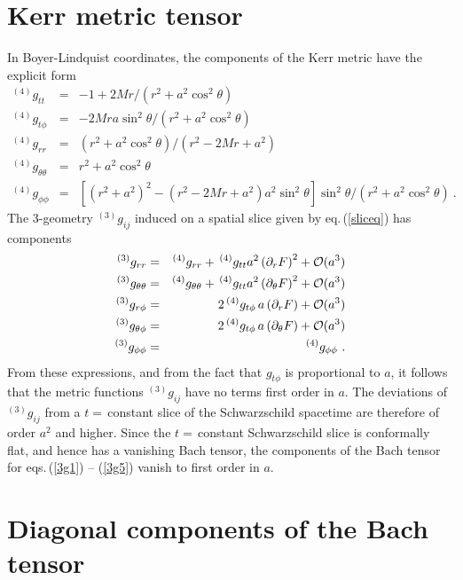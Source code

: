 \section{Kerr metric tensor}
In Boyer-Lindquist\cite{boyerlindquist} coordinates, the components
of the Kerr metric have the explicit form
\begin{eqnarray}
^{(4)}g_{tt} &=& -1+2Mr/(r^2+a^2\cos^2\theta) \label{METRICstart}\\
^{(4)}g_{t\phi} &=& -2Mra\sin^2\theta/(r^2+a^2\cos^2\theta)\\
^{(4)}g_{rr}&=& (r^2+a^2\cos^2\theta)/(r^2-2Mr+a^2)\label{grr}\\
^{(4)}g_{\theta\theta} &=&  r^2+a^2\cos^2\theta\label{METRICpenult}\\
^{(4)}g_{\phi\phi} &=&
[(r^2+a^2)^2-(r^2-2Mr+a^2)a^2\sin^2\theta]\sin^2\theta
/(r^2+a^2\cos^2\theta)\label{METRICend}\ .
\end{eqnarray}
The 3-geometry $^{(3)}g_{ij}$ induced on a spatial slice given by
eq.\,(\ref{sliceq}) has components
\begin{eqnarray}
^{(3)}g_{rr}&=&^{(4)}g_{rr}+\,^{(4)}g_{tt}a^2\left(\partial_rF\right)^2
+{\cal O}(a^3)\label{3g1} \\ 
^{(3)}g_{\theta\theta} &=&
^{(4)}g_{\theta\theta}+\,^{(4)}g_{tt}a^2\left(\partial_\theta F\right)^2
+{\cal O}(a^3) \label{3g2}\\ 
^{(3)}g_{r\phi}&=&2\,^{(4)}g_{t\phi}\,a\left(\partial_rF\right)
+{\cal O}(a^3)\label{3g3}\\ 
^{(3)}g_{\theta\phi}&=&2\,^{(4)}g_{t\phi}\,a\left(\partial_{\theta}F\right)
+{\cal O}(a^3)\label{3g4}\\ 
^{(3)}g_{\phi\phi} &=&^{(4)}g_{\phi\phi}\label{3g5}\ .
\end{eqnarray}
From these expressions, and from the fact that $g_{t\phi}$ is
proportional to $a$, it follows that the metric functions 
$^{(3)}g_{ij}$
have no
terms first order in $a$.  The deviations of 
$^{(3)}g_{ij}$ from a $t=$\,constant
slice of the Schwarzschild spacetime are therefore of order $a^2$
and higher. Since the $t=$\,constant Schwarzschild slice is 
conformally flat, and hence has a vanishing Bach tensor, the components
of the Bach tensor for eqs.\,(\ref{3g1}) -- (\ref{3g5}) vanish to first 
order in $a$.



\section{Diagonal components of the Bach tensor}

